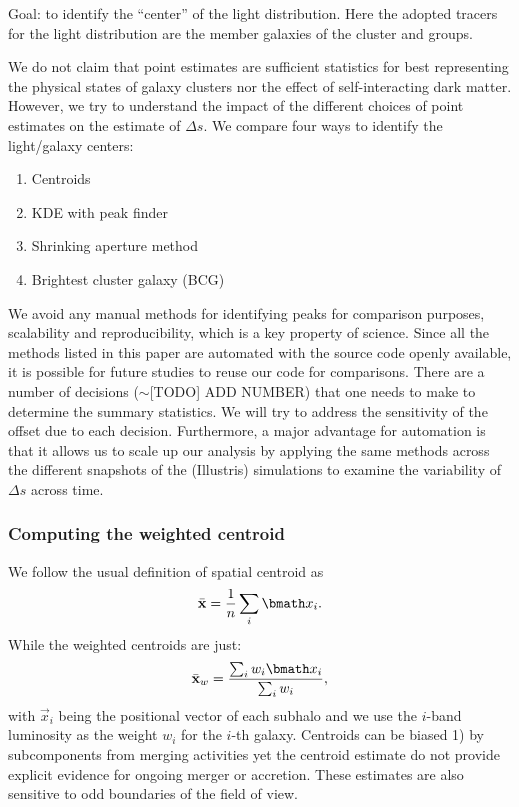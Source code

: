 Goal: to identify the ``center'' of the light distribution. Here the adopted 
tracers for the light distribution are the member galaxies of the cluster 
and groups.

We do not claim that point estimates are sufficient statistics for
best representing the physical states of galaxy clusters nor the effect of
self-interacting dark matter. However, we try to understand the impact of the
different choices of point estimates on the estimate of $\Delta s$. 
We compare four ways to identify the light/galaxy centers:
\begin{enumerate}
\item Centroids
\item KDE with peak finder
\item Shrinking aperture method
\item Brightest cluster galaxy (BCG)

\end{enumerate}
We avoid any manual methods for identifying peaks for
comparison purposes, scalability and reproducibility, 
which is a key property of science. 
Since all the methods listed in this
paper are automated with the source code openly available, 
it is possible for future studies to reuse our code for comparisons. 
There are a number of decisions ($\sim $[TODO] ADD NUMBER) that one needs to make to 
determine the summary statistics. We will try to address the sensitivity of the offset
due to each decision. 
Furthermore, a major advantage for automation is that it allows us  
to scale up our analysis by applying
the same methods across the different snapshots of the (Illustris) simulations to
examine the variability of $\Delta s$ across time. 


\subsubsection{Computing the weighted centroid}
\label{Unweighted}
We follow the usual definition of spatial centroid as 
\begin{equation}
	\bar{\bf x} = \frac{1}{n} \sum_i \vec{x}_i. 
\end{equation}
While the weighted centroids are just: 
\begin{equation}
	\bar{\bf x}_w = \frac{\sum_i w_i \vec{x}_i}{\sum_i w_i},
\end{equation}
with $\vec{x}_i$ being the positional vector of each subhalo 
and we use the $i$-band luminosity 
as the weight $w_i$ for the $i$-th galaxy.
Centroids can be biased 1) by subcomponents from merging activities yet the
centroid estimate do not provide explicit evidence for ongoing merger or 
accretion. These estimates are also sensitive to odd boundaries 
of the field of view.

